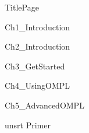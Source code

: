 \documentclass [letterpaper,12pt]{report}
\begin{document}
\fancyhf{} %
\renewcommand{\chaptermark}[1]{\markboth{\chaptername\ \thechapter.\ #1}{}}
\fancyhead[C]{\leftmark}

 {TitlePage}

\newpage
{}
\tableofcontents

\newpage
{}

 {Ch1_Introduction}

 {Ch2_Introduction}

 {Ch3_GetStarted}

 {Ch4_UsingOMPL}

 {Ch5_AdvancedOMPL}

 {unsrt}
 {Primer}
\end{document}

